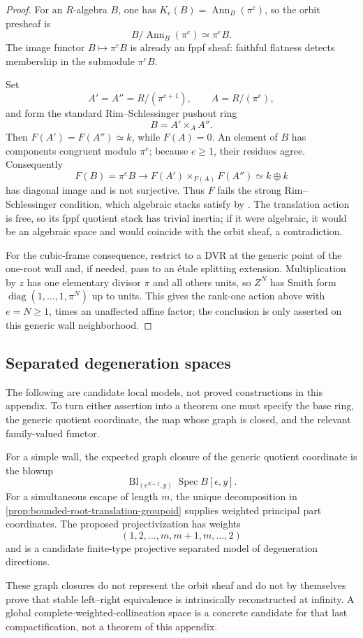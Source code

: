 \begin{proof}
For an \(R\)-algebra \(B\), one has
\(K_e(B)=\operatorname{Ann}_B(\pi^e)\), so the orbit presheaf is
\[
B/\operatorname{Ann}_B(\pi^e)\simeq\pi^eB.
\]
The image functor \(B\mapsto\pi^eB\) is already an fppf sheaf: faithful
flatness detects membership in the submodule \(\pi^eB\).

Set
\[
A'=A''=R/(\pi^{e+1}),\qquad A=R/(\pi^e),
\]
and form the standard Rim--Schlessinger pushout ring
\[
B=A'\times_AA''.
\]
Then \(F(A')=F(A'')\simeq k\), while \(F(A)=0\).  An element of \(B\) has
components congruent modulo \(\pi^e\); because \(e\ge1\), their residues
agree.  Consequently
\[
F(B)=\pi^eB\longrightarrow
F(A')\times_{F(A)}F(A'')\simeq k\oplus k
\]
has diagonal image and is not surjective.  Thus \(F\) fails the strong
Rim--Schlessinger condition, which algebraic stacks satisfy by
\cite[Lemma 98.18.2, Tag 0CXN]{stacks0CXN}.
The translation action is free, so its fppf quotient stack has trivial
inertia; if it were algebraic, it would be an algebraic space and would
coincide with the orbit sheaf, a contradiction.

For the cubic-frame consequence, restrict to a DVR at the generic point of
the one-root wall and, if needed, pass to an étale splitting extension.
Multiplication by \(z\) has one elementary divisor \(\pi\) and all others
units, so \(Z^N\) has Smith form
\(\operatorname{diag}(1,\ldots,1,\pi^N)\) up to units.  This gives the
rank-one action above with \(e=N\ge1\), times an unaffected affine factor;
the conclusion is only asserted on this generic wall neighborhood.
\end{proof}

\subsection{Separated degeneration spaces}
\label{subsec:separated-degeneration-spaces}

The following are candidate local models, not proved constructions in this
appendix.  To turn either assertion into a theorem one must specify the base
ring, the generic quotient coordinate, the map whose graph is closed, and
the relevant family-valued functor.

For a simple wall, the expected graph closure of the generic quotient
coordinate is
the blowup
\[
\operatorname{Bl}_{(\epsilon^{N+2},y)}
\operatorname{Spec} B[\epsilon,y].
\]
For a simultaneous escape of length \(m\), the unique decomposition in
\cref{prop:bounded-root-translation-groupoid} supplies weighted principal
part coordinates.  The proposed projectivization has weights
\[
(1,2,\ldots,m,m+1,m,\ldots,2)
\]
and is a candidate finite-type projective separated model of degeneration
directions.

These graph closures do not represent the orbit sheaf and do not by
themselves prove that stable left--right equivalence is intrinsically
reconstructed at infinity.  A global complete-weighted-collineation space is
a concrete candidate for that last compactification, not a theorem of this
appendix.
